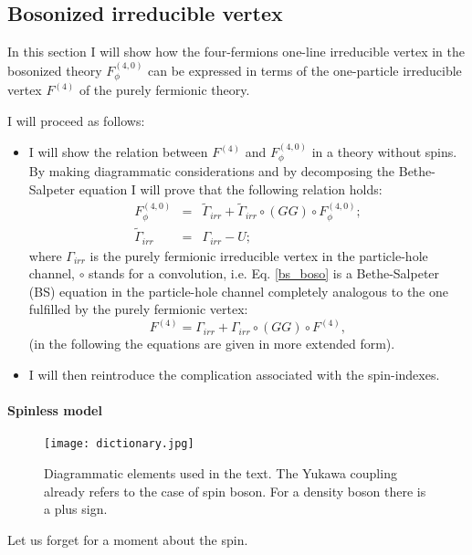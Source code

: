 \documentclass[a4paper,11pt]{article}
\begin{document}
\subsection*{ Bosonized irreducible vertex} 

In this section I will show how the four-fermions one-line irreducible vertex  in the bosonized theory $F^{(4,0)}_\phi$ can be expressed in terms of the one-particle irreducible vertex $F^{(4)}$ of the purely fermionic theory.

I will proceed as follows: 
\begin{itemize} 
\item I will show the relation between $F^{(4)}$ and $F_\phi^{(4,0)}$ in a theory without spins. 
By making diagrammatic considerations and by decomposing the Bethe-Salpeter equation I will prove that the following relation holds: 
\begin{eqnarray}
\label{bs_boso}
F_\phi^{(4,0)}&=&\tilde\Gamma_{irr}
+\tilde \Gamma_{irr}  \circ (GG) \circ F_\phi^{(4,0)};
\\ 
\tilde \Gamma_{irr} & = &\Gamma_{irr} - U; 
\end{eqnarray}
where $\Gamma_{irr}$ is the purely fermionic irreducible vertex in the particle-hole channel\cite{Rohringer2012},  $\circ$ stands for a convolution, i.e. Eq. \ref{bs_boso} is a Bethe-Salpeter (BS) equation in the particle-hole channel completely analogous to the one fulfilled by the purely fermionic vertex: 
\begin{equation} 
\label{bs_fermi} 
F^{(4)}=\Gamma_{irr}
+\Gamma_{irr} \circ (GG) \circ F^{(4)}, 
\end{equation} 
(in the following the equations are given in more extended form). 
\item I will then reintroduce the complication associated with the spin-indexes. 
\end{itemize}
\paragraph{Spinless model} 

\begin{figure}
\texttt{[image: dictionary.jpg]}
\caption{Diagrammatic elements used in the text. The Yukawa coupling already refers to the case of spin boson. For a density boson there is a plus sign. } \label{dictionary}

\end{figure}
Let us forget for a moment about the spin.
\end{document}
